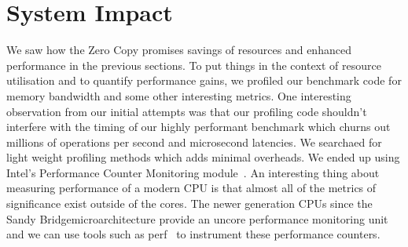 %



\section{System Impact}
\label{sec:impact}

We saw how the Zero Copy promises savings of resources and enhanced performance 
in the previous sections. To put things in the context of resource utilisation and
 to quantify performance gains, we profiled our benchmark code for memory bandwidth 
 and some other interesting metrics. One interesting observation from our initial 
 attempts was that our profiling code shouldn't interfere with the timing of our highly performant 
 benchmark which churns out millions of operations per second and microsecond latencies. 
 We searchaed for light weight profiling methods which adds minimal overheads.
 We ended up using Intel\textregistered's Performance Counter Monitoring module~\cite{intelpcm}. 
 An interesting thing about measuring performance 
 of a modern CPU is that almost all of the metrics of significance exist outside of the cores.
 The newer generation CPUs since the Sandy Bridge\textregistered microarchitecture provide an uncore performance 
 monitoring unit and we can use tools such as perf~\cite{perftool} to instrument these performance 
 counters. 

